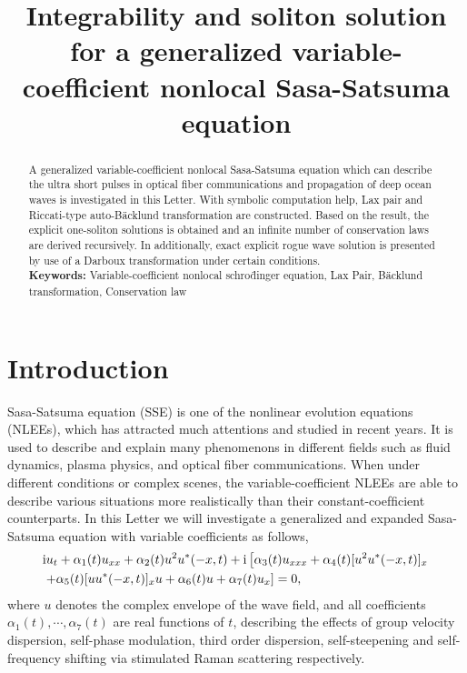 \documentclass[12pt]{article}
\title{\large\bfseries Integrability and soliton solution for a generalized variable-coefficient nonlocal Sasa-Satsuma equation}
\author{}
\begin{document}
\maketitle

\begin{abstract}
A generalized variable-coefficient nonlocal Sasa-Satsuma equation which can describe the ultra short pulses in optical fiber communications and propagation of deep ocean waves is investigated in this Letter. With symbolic computation help, Lax pair and Riccati-type auto-B\"acklund transformation are constructed. Based on the result, the explicit one-soliton solutions is obtained and an infinite number of conservation laws are derived recursively. In additionally, exact explicit rogue wave solution is presented by use of a Darboux transformation under certain conditions. \\
\indent\textbf{Keywords:} Variable-coefficient nonlocal schro\"dinger equation, Lax Pair, B\"acklund transformation, Conservation law
\end{abstract}

\section{Introduction}
Sasa-Satsuma equation (SSE) is one of the nonlinear evolution equations (NLEEs), which has attracted much attentions and studied in recent years. It is used to describe and explain many phenomenons in different fields such as fluid dynamics, plasma physics, and optical fiber communications.\cite{1,2,3,4,5,6,7,8,9,10,11,12,13} When under different conditions or complex scenes, the variable-coefficient NLEEs are able to describe various situations more realistically than their constant-coefﬁcient counterparts.\cite{12,13} In this Letter we will investigate a generalized and expanded Sasa-Satsuma equation with variable coefficients as follows,
\begin{align}
  & \mathrm{i}u_{t} + \alpha_1(t) u_{xx} + \alpha_2(t)u^2u^*(-x,t) + \mathrm{i}\left[\alpha_3(t)u_{xxx} + \alpha_{4}(t)[u^{2}u^*(-x,t)]_{x}  \right. \notag\\
  & \left. + \alpha_{5}(t)[uu^*(-x,t)]_{x}u + \alpha_{6}(t)u + \alpha_{7}(t)u_x\right] = 0,   \label{1}
\end{align}
where $u$ denotes the complex envelope of the wave field, and all coefficients $\alpha_{1}(t), \cdots, \alpha_{7}(t)$ are real functions of $t$, describing the effects of group velocity dispersion, self-phase modulation, third order dispersion, self-steepening and self-frequency shifting via stimulated Raman scattering respectively.
\end{document}

